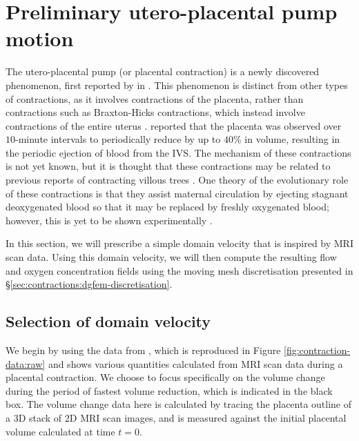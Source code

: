    \section{Preliminary utero-placental pump motion} \label{sec:contractions:placenta}    
        The utero-placental pump (or placental contraction) is a newly discovered phenomenon, first reported by \citeauthor{dellschaftHaemodynamicsHumanPlacenta2020} \cite{dellschaftHaemodynamicsHumanPlacenta2020} in \citeyear{dellschaftHaemodynamicsHumanPlacenta2020}. This phenomenon is distinct from other types of contractions, as it involves contractions of the placenta, rather than contractions such as Braxton-Hicks contractions, which instead involve contractions of the entire uterus \cite{togashiSustainedUterineContractions1993}. \citeauthor{dellschaftHaemodynamicsHumanPlacenta2020} \cite{dellschaftHaemodynamicsHumanPlacenta2020} reported that the placenta was observed over $10$-minute intervals to periodically reduce by up to $40\%$ in volume, resulting in the periodic ejection of blood from the IVS. The mechanism of these contractions is not yet known, but it is thought that these contractions may be related to previous reports of contracting villous trees \cite{farleyContractilePropertiesHuman2004,dellschaftHaemodynamicsHumanPlacenta2020}. One theory of the evolutionary role of these contractions is that they assist maternal circulation by ejecting stagnant deoxygenated blood so that it may be replaced by freshly oxygenated blood; however, this is yet to be shown experimentally \cite{dellschaftHaemodynamicsHumanPlacenta2020}.

        In this section, we will prescribe a simple domain velocity that is inspired by MRI scan data. Using this domain velocity, we will then compute the resulting flow and oxygen concentration fields using the moving mesh discretisation presented in \S\ref{sec:contractions:dgfem-discretisation}.

        \subsection{Selection of domain velocity} \label{sec:contractions:placenta:mesh-velocity}
            We begin by using the data from \citeauthor{gowlandCharacterisingPlacentalContractions2024} \cite{gowlandCharacterisingPlacentalContractions2024}, which is reproduced in Figure \ref{fig:contraction-data:raw} and shows various quantities calculated from MRI scan data during a placental contraction. We choose to focus specifically on the volume change during the period of fastest volume reduction, which is indicated in the black box. The volume change data here is calculated by tracing the placenta outline of a 3D stack of 2D MRI scan images, and is measured against the initial placental volume calculated at time $t = 0$.

